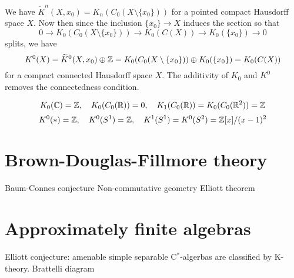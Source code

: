 \documentclass{../../large}
\begin{document}
We have $\tilde K^n(X,x_0)=K_n(C_0(X\setminus\{x_0\}))$ for a pointed compact Hausdorff space $X$.
Now then since the inclusion $\{x_0\}\to X$ induces the section so that
\[0\to K_0(C_0(X\setminus\{x_0\}))\to K_0(C(X))\to K_0(\{x_0\})\to0\]
splits, we have
\[K^0(X)=\widetilde K^0(X,x_0)\oplus\mathbb{Z}=K_0(C_0(X\setminus\{x_0\}))\oplus K_0(\{x_0\})=K_0(C(X))\]
for a compact connected Hausdorff space $X$.
The additivity of $K_0$ and $K^0$ removes the connectedness condition.

\[K_0(\mathbb{C})=\mathbb{Z},\quad K_0(C_0(\mathbb{R}))=0,\quad K_1(C_0(\mathbb{R}))=K_0(C_0(\mathbb{R}^2))=\mathbb{Z}\]
\[K^0(*)=\mathbb{Z},\quad K^0(S^1)=\mathbb{Z},\quad K^1(S^1)=K^0(S^2)=\mathbb{Z}[x]/(x-1)^2\]




\section{Brown-Douglas-Fillmore theory}
\begin{prb}
\end{prb}

Baum-Connes conjecture
Non-commutative geometry
Elliott theorem




\section{Approximately finite algebras}
Elliott conjecture: amenable simple separable C$^*$-algerbas are classified by K-theory.
Brattelli diagram
\end{document}
